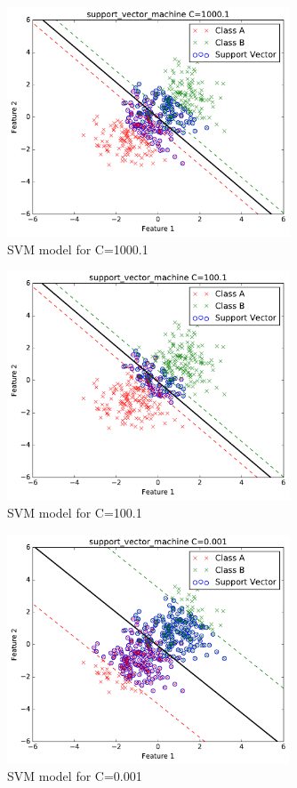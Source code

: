 \documentclass[runningheads]{llncs}
\begin{document}
\begin{figure}
\centering
\includegraphics[width=0.75\textwidth]{support_vector_machine1000_1.pdf}
\caption{SVM model for C=1000.1} \label{fig:svm_c_1000.1}
\end{figure}
\begin{figure}
\centering
\includegraphics[width=0.75\textwidth]{support_vector_machine100_1.pdf}
\caption{SVM model for C=100.1} \label{fig:svm_c_100.1}
\end{figure}
\begin{figure}
\centering
\includegraphics[width=0.75\textwidth]{support_vector_machine0_001.pdf}
\caption{SVM model for C=0.001} \label{fig:svm_c_0.001}
\end{figure}
\end{document}
